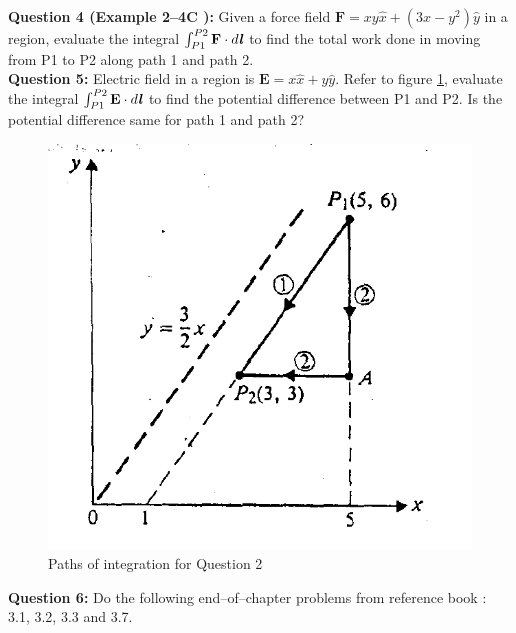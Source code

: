 \documentclass[12pt,a4paper]{article}
\begin{document}
\noindent\textbf{Question 4 (Example 2--4C \cite[Example 2--4, page 23]{Cheng}):} Given a force field $\textbf{F}=xy\hat x+(3x-y^2)\hat y$ in a region, evaluate the integral $\int_{P1}^{P2}\textbf{F}\cdot d\textbf{\textit{l}}$ to find the total work done in moving from P1 to P2 along path 1 and path 2.\\[0.2cm]
\noindent\textbf{Question 5:} Electric field in a region is $\textbf{E}=x\hat x+y\hat y$. Refer to figure \ref{Cheng-integral}, evaluate the integral $\int_{P1}^{P2}\textbf{E}\cdot d\textbf{\textit{l}}$ to find the potential difference between P1 and P2. Is the potential difference same for path 1 and path 2?
\begin{figure}[H]
\centering
\includegraphics[scale=0.6]{Figure2-10Cheng.png}
\caption{Paths of integration for Question 2 \cite[Figure 2--10, page 23]{Cheng}}
\label{Cheng-integral}
\end{figure}
\noindent\textbf{Question 6:} Do the following end--of--chapter problems from reference book \cite[Page 93 and 94]{Sadiku}: 3.1, 3.2, 3.3 and 3.7.


\end{document}
